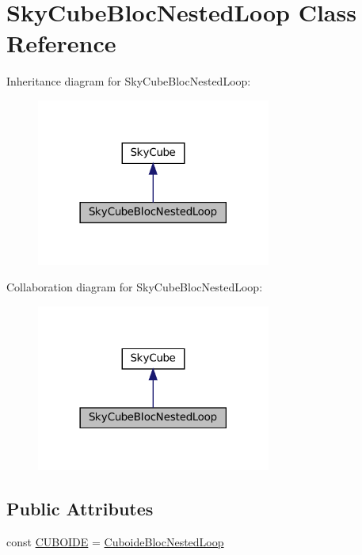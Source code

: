 \hypertarget{class_sky_cube_bloc_nested_loop}{}\section{Sky\+Cube\+Bloc\+Nested\+Loop Class Reference}
\label{class_sky_cube_bloc_nested_loop}


Inheritance diagram for Sky\+Cube\+Bloc\+Nested\+Loop\+:\nopagebreak
\begin{figure}[H]
\begin{center}
\leavevmode
\includegraphics[width=218pt]{class_sky_cube_bloc_nested_loop__inherit__graph}
\end{center}
\end{figure}


Collaboration diagram for Sky\+Cube\+Bloc\+Nested\+Loop\+:\nopagebreak
\begin{figure}[H]
\begin{center}
\leavevmode
\includegraphics[width=218pt]{class_sky_cube_bloc_nested_loop__coll__graph}
\end{center}
\end{figure}
\subsection*{Public Attributes}
\begin{DoxyCompactItemize}
\item 
const \hyperlink{class_sky_cube_bloc_nested_loop_a680905c28bba7313409d01b0bbfac33a}{C\+U\+B\+O\+I\+DE} = \textquotesingle{}\hyperlink{class_cuboide_bloc_nested_loop}{Cuboide\+Bloc\+Nested\+Loop}\textquotesingle{}
\end{DoxyCompactItemize}
